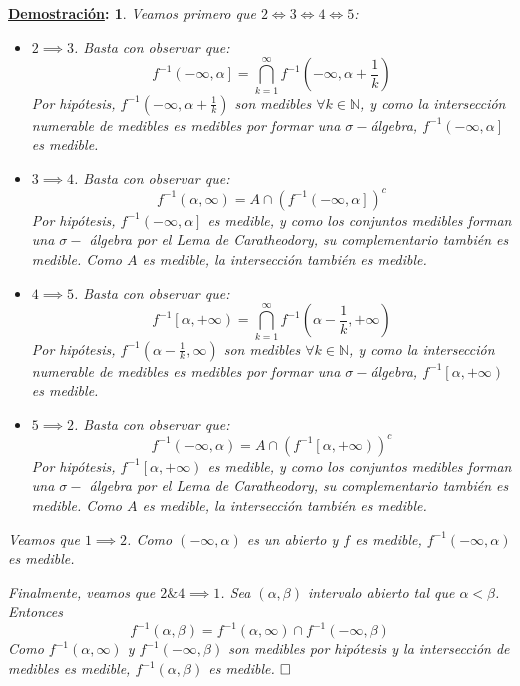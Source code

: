 \documentclass[10pt,a4paper,openright]{book}
\theoremstyle{break}
\newtheorem*{demo}{\underline{Demostración}:}
\begin{document}
\begin{demo}
Veamos primero que $2 \iff 3 \iff 4 \iff 5$: 
\begin{itemize}
    \item $2 \implies 3$. Basta con observar que:
    $$f^{-1}\left( -\infty, \alpha \right] = \bigcap_{k=1}^\infty f^{-1}\left( -\infty, \alpha + \frac{1}{k} \right)$$
    Por hipótesis, $f^{-1}\left( -\infty, \alpha + \frac{1}{k} \right)$ son medibles $\forall k \in \mathbb{N}$, y como la intersección numerable de medibles es medibles por formar una $\sigma-$álgebra, $f^{-1}\left( -\infty, \alpha \right]$ es medible. 
    \item $3 \implies 4$. Basta con observar que:
    $$f^{-1}\left( \alpha,  \infty \right) = A \cap \left(f^{-1}\left( -\infty, \alpha \right] \right)^c$$
    Por hipótesis, $f^{-1}\left( -\infty, \alpha \right] $ es medible, y como los conjuntos medibles forman una $\sigma -$ álgebra por el Lema de Caratheodory, su complementario también es medible. Como $A$ es medible, la intersección también es medible.
    \item $4 \implies 5$. Basta con observar que:
    $$f^{-1}\left[ \alpha, +\infty \right) = \bigcap_{k=1}^\infty f^{-1}\left( \alpha - \frac{1}{k}, +\infty \right)$$
    Por hipótesis, $f^{-1}\left( \alpha - \frac{1}{k}, \infty \right)$ son medibles $\forall k \in \mathbb{N}$, y como la intersección numerable de medibles es medibles por formar una $\sigma-$álgebra, $f^{-1}\left[ \alpha, +\infty \right)$ es medible.
    \item $5 \implies 2$. Basta con observar que:
    $$f^{-1}\left( -\infty,  \alpha \right) = A \cap \left(f^{-1}\left[ \alpha, +\infty \right) \right)^c$$
    Por hipótesis, $f^{-1}\left[ \alpha, +\infty \right) $ es medible, y como los conjuntos medibles forman una $\sigma -$ álgebra por el Lema de Caratheodory, su complementario también es medible. Como $A$ es medible, la intersección también es medible.
\end{itemize}
Veamos que $1 \implies 2$. Como $\left( -\infty, \alpha \right)$ es un abierto y $f$ es medible, $f^{-1}\left( -\infty, \alpha \right)$ es medible.

Finalmente, veamos que $2 \& 4 \implies 1$. Sea $\left( \alpha, \beta \right)$ intervalo abierto tal que $\alpha < \beta$. Entonces
$$f^{-1}\left( \alpha, \beta \right) = f^{-1}\left( \alpha, \infty \right) \cap f^{-1}\left( -\infty, \beta \right)$$
Como $f^{-1}\left( \alpha, \infty \right)$ y $f^{-1}\left( -\infty, \beta \right)$ son medibles por hipótesis y la intersección de medibles es medible, $f^{-1}\left( \alpha, \beta \right)$ es medible.
$\hfill \square$
\end{demo}
\end{document}
